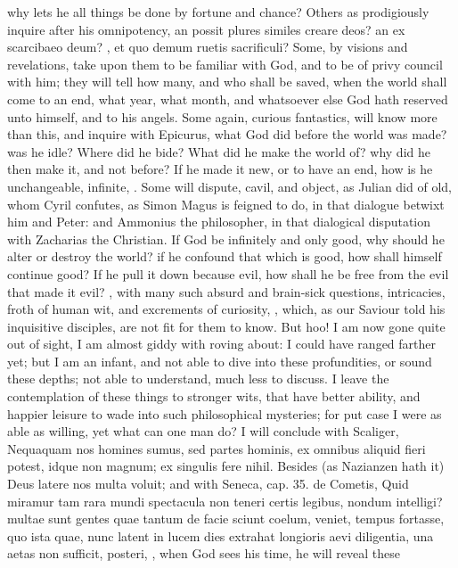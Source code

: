 {why lets he all things be done by fortune and chance? Others as
prodigiously inquire after his omnipotency, an possit plures similes
creare deos? an ex scarcibaeo deum? \etc{}, et quo demum ruetis
sacrificuli? Some, by visions and revelations, take upon them to be
familiar with God, and to be of privy council with him; they will tell
how many, and who shall be saved, when the world shall come to an end,
what year, what month, and whatsoever else God hath reserved unto
himself, and to his angels. Some again, curious fantastics, will know
more than this, and inquire with Epicurus, what God did before
the world was made? was he idle? Where did he bide? What did he make
the world of? why did he then make it, and not before? If he made it
new, or to have an end, how is he unchangeable, infinite, \etc{}. Some will
dispute, cavil, and object, as Julian did of old, whom Cyril confutes,
as Simon Magus is feigned to do, in that dialogue betwixt him and
Peter: and Ammonius the philosopher, in that dialogical disputation
with Zacharias the Christian. If God be infinitely and only good, why
should he alter or destroy the world? if he confound that which is
good, how shall himself continue good? If he pull it down because evil,
how shall he be free from the evil that made it evil? \etc{}, with many
such absurd and brain-sick questions, intricacies, froth of human wit,
and excrements of curiosity, \etc{}, which, as our Saviour told his
inquisitive disciples, are not fit for them to know. But hoo! I am now
gone quite out of sight, I am almost giddy with roving about: I could
have ranged farther yet; but I am an infant, and not able to dive
into these profundities, or sound these depths; not able to understand,
much less to discuss. I leave the contemplation of these things to
stronger wits, that have better ability, and happier leisure to wade
into such philosophical mysteries; for put case I were as able as
willing, yet what can one man do? I will conclude with Scaliger,
Nequaquam nos homines sumus, sed partes hominis, ex omnibus aliquid
fieri potest, idque non magnum; ex singulis fere nihil. Besides (as
Nazianzen hath it) Deus latere nos multa voluit; and with Seneca, cap.
35. de Cometis, Quid miramur tam rara mundi spectacula non teneri
certis legibus, nondum intelligi? multae sunt gentes quae tantum de
facie sciunt coelum, veniet, tempus fortasse, quo ista quae, nunc
latent in lucem dies extrahat longioris aevi diligentia, una aetas non
sufficit, posteri, \etc{}, when God sees his time, he will reveal these
}
